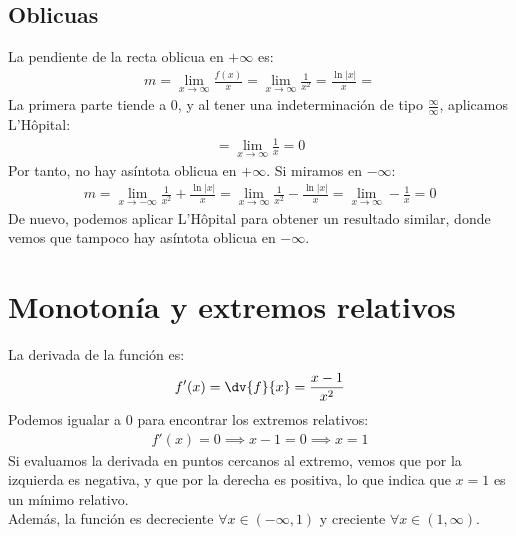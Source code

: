 \documentclass{article}
\begin{document}
\subsection{Oblicuas}
La pendiente de la recta oblicua en \(+\infty\) es:
\begin{equation}
	\begin{split}
		m = \lim_{x \to \infty} \frac{f(x)}{x}=
		\lim_{x \to \infty} \frac{1}{x^{2}} = \frac{\ln |x|}{x}=
	\end{split}
\end{equation}
La primera parte tiende a 0, y al tener una indeterminación de tipo \(\frac{\infty}{\infty}\),
aplicamos L'Hôpital:
\begin{equation}
	\begin{split}
		= \lim_{x \to \infty} \frac{1}{x}=0
	\end{split}
\end{equation}
Por tanto, no hay asíntota oblicua en \(+\infty\). Si miramos en \(-\infty\):
\begin{equation}
	\begin{split}
		m=\lim_{x \to -\infty} \frac{1}{x^{2}} + \frac{\ln |x|}{x}
		= \lim_{x \to \infty} \frac{1}{x^{2}}- \frac{\ln |x|}{x}
		= \lim_{x \to \infty} -\frac{1}{x}=0
	\end{split}
\end{equation}
De nuevo, podemos aplicar L'Hôpital para obtener un resultado similar, donde vemos que tampoco
hay asíntota oblicua en \(-\infty\).
\section{Monotonía y extremos relativos}
La derivada de la función es:
\begin{equation}
	\begin{split}
		f'(x)=\dv{f}{x}= \frac{x-1}{x^{2}}
	\end{split}
\end{equation}
Podemos igualar a \(0\) para encontrar los extremos relativos:
\begin{equation}
	\begin{split}
		f'(x)=0 \implies x-1=0 \implies x=1
	\end{split}
\end{equation}
Si evaluamos la derivada en puntos cercanos al extremo, vemos que por la izquierda es negativa,
y que por la derecha es positiva, lo que indica que \(x=1\) es un mínimo relativo.\\
Además, la función es decreciente \(\forall x \in (-\infty, 1)\) y creciente
\(\forall x \in (1, \infty)\).
\end{document}

